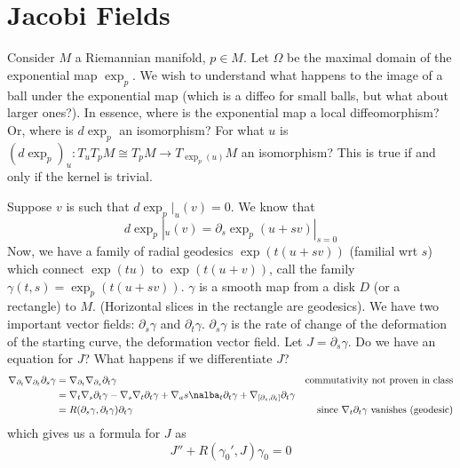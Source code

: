 \documentclass[../main.tex]{subfiles}
\begin{document}
\section{Jacobi Fields}
Consider $M$ a Riemannian manifold, $p\in M$. Let $\Omega$ be the maximal domain
of the exponential map $\exp_p$. We wish to understand what happens to the image
of a ball under the exponential map (which is a diffeo for small balls, but what
about larger ones?). In essence, where is the exponential map a local
diffeomorphism? Or, where is $d\exp_p$ an isomorphism? For what $u$ is
$(d\exp_p)_u:T_uT_pM \cong T_pM \to T_{\exp_p(u)}M$ an isomorphism? This is true
if and only if the kernel is trivial.

Suppose $v$ is such that $d\exp_p|_u(v) = 0$. We know that 
\[
    d\exp_p|_u(v) = \partial_s\exp_p(u+sv)|_{s=0}
\]
Now, we have a family of radial geodesics $\exp(t(u+sv))$ (familial wrt $s$)
which connect $\exp(tu)$ to $\exp(t(u+v))$, call the family $\gamma(t,s) =
\exp_p(t(u+sv))$. $\gamma$ is a smooth map from a disk $D$ (or a rectangle) to
$M$. (Horizontal slices in the rectangle are geodesics). We have two important
vector fields: $\partial_s\gamma$ and $\partial_t\gamma$. $\partial_s\gamma$ is
the rate of change of the deformation of the starting curve, the deformation
vector field. Let $J=\partial_s\gamma$. Do we have an equation for $J$? What
happens if we differentiate $J$?
\[
    \begin{aligned}
    \nabla_{\partial_t}\nabla_{\partial_t}\partial_s\gamma  &=
    \nabla_{\partial_t}\nabla_{\partial_s}\partial_t\gamma &\text{commutativity
    not proven in class}\\
    &= \nabla_t\nabla_s\partial_t\gamma - \nabla_s\nabla_t\partial_t\gamma +
    \nabla_as\nalba_t\partial_t\gamma +
    \nabla_{[\partial_s,\partial_t]}\partial_t\gamma\\
    &=R(\partial_s\gamma,\partial_t\gamma)\partial_t\gamma &\text{since
    $\nabla_t\partial_t\gamma$ vanishes (geodesic)}
\end{aligned}
\]
which gives us a formula for $J$ as
\[
    J'' + R(\gamma_0',J)\gamma_0 = 0
\]
\end{document}

